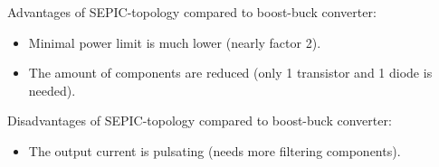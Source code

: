 \begin{solutionblock}
    Advantages of SEPIC-topology compared to boost-buck converter:
    \begin{itemize}
        \item Minimal power limit is much lower (nearly factor 2).
        \item The amount of components are reduced (only 1 transistor and 1 diode is needed).
    \end{itemize}  
    Disadvantages of SEPIC-topology compared to boost-buck converter:
    \begin{itemize}
        \item The output current is pulsating (needs more filtering components).
    \end{itemize}  
\end{solutionblock}
